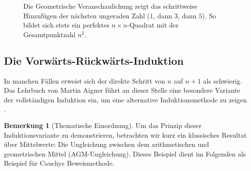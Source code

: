 \documentclass{article}
\theoremstyle{definition}
\newtheorem{bem}[thm]{Bemerkung}
\begin{document}
\begin{figure}[H]
\centering
{}
\caption{Die Geometrische Veranschaulichung zeigt das schrittweise Hinzufügen der nächsten ungeraden Zahl ($1$, dann $3$, dann $5$). So bildet sich stets ein perfektes $n \times n$-Quadrat mit der Gesamtpunktzahl $n^2$.}
\label{fig:ungerade_summe}
\end{figure}

\subsection{Die Vorwärts-Rückwärts-Induktion}
In manchen Fällen erweist sich der direkte Schritt von $n$ auf $n+1$ als schwierig. Das Lehrbuch von Martin Aigner führt an dieser Stelle eine besondere Variante der vollständigen Induktion ein, um eine alternative Induktionsmethode zu zeigen \cite{aigner}. 

\begin{bem}[Thematische Einordnung]
Um das Prinzip dieser Induktionsvariante zu demonstrieren, betrachten wir kurz ein klassisches Resultat über Mittelwerte: Die Ungleichung zwischen dem arithmetischen und geometrischen Mittel (AGM-Ungleichung). Dieses Beispiel dient im Folgenden als Beispiel für Cauchys Beweismethode.
\end{bem}
\end{document}
